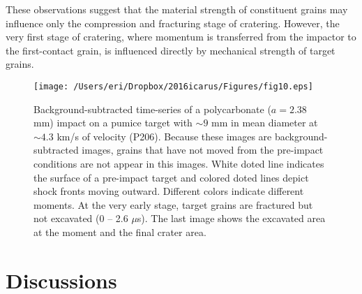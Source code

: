 \documentclass[3p,authoryear]{elsarticle}
\begin{document}
These observations suggest that the material strength of constituent grains may influence only the compression and fracturing stage of cratering.
However, the very first stage of cratering, where momentum is transferred from the impactor to the first-contact grain, is influenced directly by mechanical strength of target grains.


\begin{figure*}[phtb]
	\centering
	\texttt{[image: /Users/eri/Dropbox/2016icarus/Figures/fig10.eps]}
	\caption{Background-subtracted time-series of a polycarbonate ($a=2.38$ mm) impact on a pumice target with $\sim 9$ mm in mean diameter at $\sim 4.3$ km/s of  velocity (P206). Because these images are background-subtracted images, grains that have not moved from the pre-impact conditions are not appear in this images. White doted line indicates the surface of a pre-impact target and colored doted lines depict shock fronts moving outward. Different colors indicate different moments. At the very early stage, target grains are fractured but not excavated (0 -- 2.6 $\mu$s). The last image shows the excavated area at the moment and the final crater area.}
	\label{snapshots}
	\centering
\end{figure*}


%

\section{Discussions}

\end{document}
